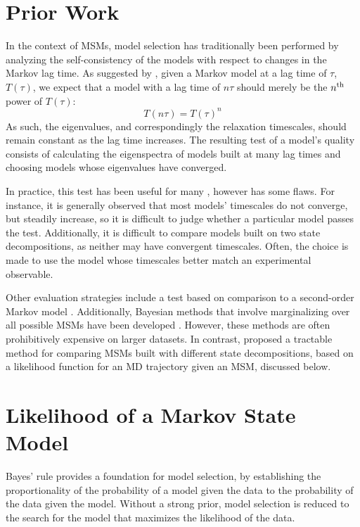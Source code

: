 \documentclass[journal=jpcbfk, layout=twocolumn, manuscript=article]{achemso}
\begin{document}
\section{Prior Work}
In the context of MSMs, model selection has traditionally been performed by analyzing the self-consistency of the models with respect to changes in the Markov lag time. As suggested by \citet{Swope2004Describing}, given a Markov model at a lag time of $\tau$, $T(\tau)$, we expect that a model with a lag time of $n\tau$ should merely be the $n^\textnormal{th}$ power of $T(\tau)$:
$$ T(n\tau) = T(\tau)^n $$ As such, the eigenvalues, and correspondingly the relaxation timescales, should remain constant as the lag time increases. The resulting test of a model's quality consists of calculating the eigenspectra of models built at many lag times and choosing models whose eigenvalues have converged. 

In practice, this test has been useful for many \cite{Noe2009Constructing}, however has some flaws. For instance, it is generally observed that most models' timescales do not converge, but steadily increase, so it is difficult to judge whether a particular model passes the test. Additionally, it is difficult to compare models built on two state decompositions, as neither may have convergent timescales. Often, the choice is made to use the model whose timescales better match an experimental observable.

Other evaluation strategies include a test based on comparison to a second-order Markov model \cite{Park2006Validation}. Additionally, Bayesian methods that involve marginalizing over all possible MSMs have been developed \cite{Bacallado2009Bayesian, *Bacallado2011Bayesian}. However, these methods are often prohibitively expensive on larger datasets. In contrast, \citet{Kellogg2012Evaluation} proposed a tractable method for comparing MSMs built with different state decompositions, based on a likelihood function for an MD trajectory given an MSM, discussed below.

\section{Likelihood of a Markov State Model}
Bayes' rule provides a foundation for model selection, by establishing the proportionality of the probability of a model given the data to the probability of the data given the model. Without a strong prior, model selection is reduced to the search for the model that maximizes the likelihood of the data. 
\end{document}
